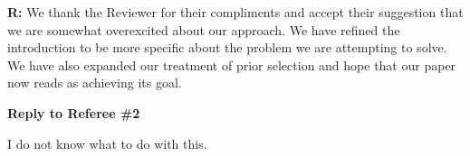 \documentclass[12pt]{letter}
\begin{document}
	\textbf{R:} We thank the Reviewer for their compliments and accept their suggestion that we are somewhat overexcited about our approach. We have refined the introduction to be more specific about the problem we are attempting to solve. We have also expanded our treatment of prior selection and hope that our paper now reads as achieving its goal.






{\Large \bf Reply to Referee \#2}

	I do not know what to do with this.
\end{document}
